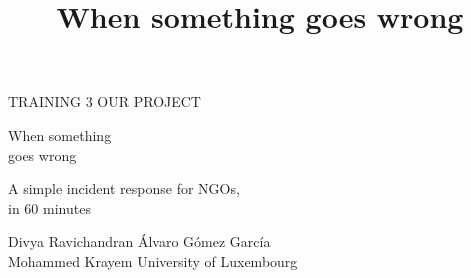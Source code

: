 \documentclass[aspectratio=169,11pt,t]{beamer}
\title{When something goes wrong}
\begin{document}
{\darkslide
\begin{frame}[plain,c]
  \vspace*{-2mm}
  {\kickerfont\fontsize{8}{10}\selectfont\color{alert}TRAINING 3 \textbullet{} OUR PROJECT}\par\vspace{4mm}
  \begin{minipage}{100mm}\raggedright
    {\headfont\fontsize{27}{32}\selectfont When something\\ goes wrong\par}\par\vspace{3mm}
    {\lightfont\fontsize{14}{18}\selectfont\color{soft}A simple incident response for NGOs,\\ in 60 minutes}\par\vspace{8mm}
    {\small\color{soft}Divya Ravichandran \textbullet{} Álvaro Gómez García\\Mohammed Krayem \textbullet{} University of Luxembourg\par}
  \end{minipage}
\end{frame}
}
\end{document}
